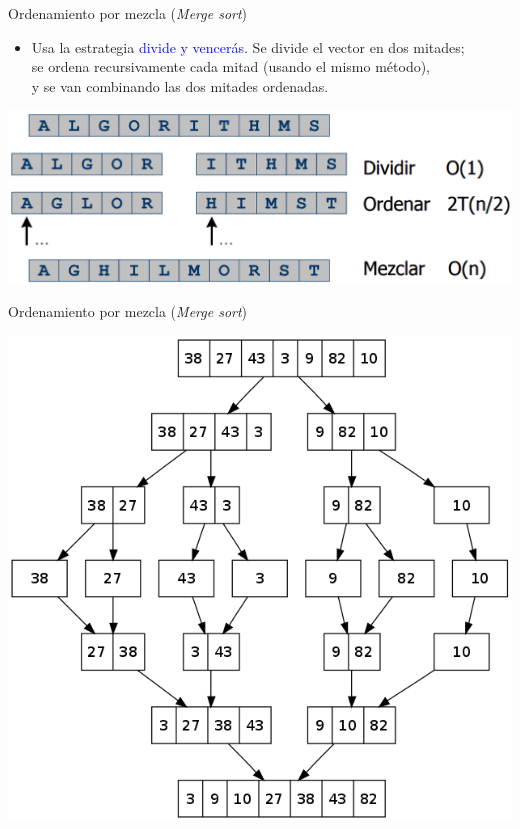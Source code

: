 \documentclass{beamer} %
\newcommand{\blue}[1]{\textcolor{blue}{#1}}
\begin{document}
\begin{frame}{Ordenamiento por mezcla ({\em Merge sort})}
    \begin{itemize}
        \item {\footnotesize Usa la estrategia \blue{divide y vencerás}. Se divide el vector en dos mitades;\\ se ordena recursivamente cada mitad (usando el mismo método),\\ y se van combinando las dos mitades ordenadas.}
    \end{itemize}
    \begin{center}
        \includegraphics[width=.9\textwidth]{./image/cap5/merge-sort1.png}
    \end{center}
\end{frame}


\begin{frame}{Ordenamiento por mezcla ({\em Merge sort})}
    \begin{center}
        \includegraphics[width=.65\textwidth]{./image/cap5/merge-sort2.png}
    \end{center}
\end{frame}
\end{document}
